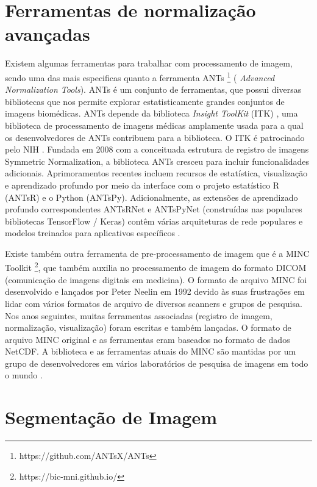 \documentclass[openright]{UFRGS} %
\begin{document}
\section{Ferramentas de normalização avançadas}

Existem  algumas ferramentas para trabalhar com processamento de imagem, sendo uma das mais  especificas quanto a ferramenta ANTs \footnote[1]{https://github.com/ANTsX/ANTs} ( \textit{Advanced Normalization Tools}). ANTs é um conjunto de ferramentas, que possui  diversas bibliotecas que nos permite explorar estatisticamente grandes conjuntos de imagens biomédicas.
ANTs depende da biblioteca \textit{Insight ToolKit} (ITK) , uma biblioteca de processamento de imagens médicas amplamente usada para a qual os desenvolvedores de ANTs contribuem para a biblioteca. O ITK é
patrocinado pelo NIH \cite{tustison2014advanced}. Fundada em 2008 com a conceituada estrutura de registro de imagens Symmetric Normalization, a biblioteca ANTs cresceu para incluir funcionalidades adicionais. Aprimoramentos recentes incluem recursos de estatística, visualização e aprendizado profundo por meio da interface com o projeto estatístico R (ANTsR) e o Python (ANTsPy). Adicionalmente, as extensões de aprendizado profundo correspondentes ANTsRNet e ANTsPyNet (construídas nas populares bibliotecas TensorFlow / Keras) contêm várias arquiteturas de rede populares e modelos treinados para aplicativos específicos \cite{tustison2014advanced}.

Existe também outra ferramenta de pre-processamento de imagem que é a  MINC Toolkit \footnote{https://bic-mni.github.io/}, que  também auxilia no processamento de imagem do formato DICOM (comunicação de imagens digitais em medicina). O formato de arquivo MINC  foi desenvolvido  e lançados por Peter Neelin em 1992 devido às suas frustrações em lidar com vários formatos de arquivo de diversos scanners e grupos de pesquisa. Nos anos seguintes, muitas ferramentas associadas (registro de imagem, normalização, visualização) foram escritas e também lançadas. O formato de arquivo MINC original e as ferramentas eram baseados no formato de dados NetCDF. A biblioteca e as ferramentas atuais do MINC são mantidas por um grupo de desenvolvedores em vários laboratórios de pesquisa de imagens em todo o mundo \cite{shafiei2020spatial}.

 
\section{Segmentação de Imagem}
\end{document}
